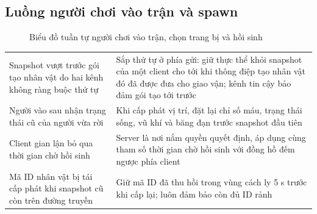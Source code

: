 \subsection{Luồng người chơi vào trận và spawn}
\begin{figure}[H]
\centering
\renewcommand{\seqstep}{0.64cm}
\caption{Biểu đồ tuần tự người chơi vào trận, chọn trang bị và hồi sinh}
\label{fig:C-luong-vao}
\end{figure}

\begin{center}\small
\begin{tabularx}{\linewidth}{|L{4.4cm}|Y|}
\hline
{} &  \\ \hline
Snapshot vượt trước gói tạo nhân vật do hai kênh không ràng buộc thứ tự & Sắp thứ tự ở phía gửi: giữ thực thể khỏi snapshot của một client cho tới khi thông điệp tạo nhân vật đó đã được đưa cho giao vận; kênh tin cậy bảo đảm gói tạo tới trước \\ \hline
Người vào sau nhận trạng thái cũ của người vừa rời & Khi cấp phát vị trí, đặt lại chỉ số máu, trạng thái sống, vũ khí và băng đạn trước snapshot đầu tiên \\ \hline
Client gian lận bỏ qua thời gian chờ hồi sinh & Server là nơi nắm quyền quyết định, áp dụng cùng tham số thời gian chờ hồi sinh với đồng hồ đếm ngược phía client \\ \hline
Mã ID nhân vật bị tái cấp phát khi snapshot cũ còn trên đường truyền & Giữ mã ID đã thu hồi trong vùng cách ly 5 s trước khi cấp lại; luôn đảm bảo còn đủ ID rảnh \\ \hline
\end{tabularx}
\end{center}

